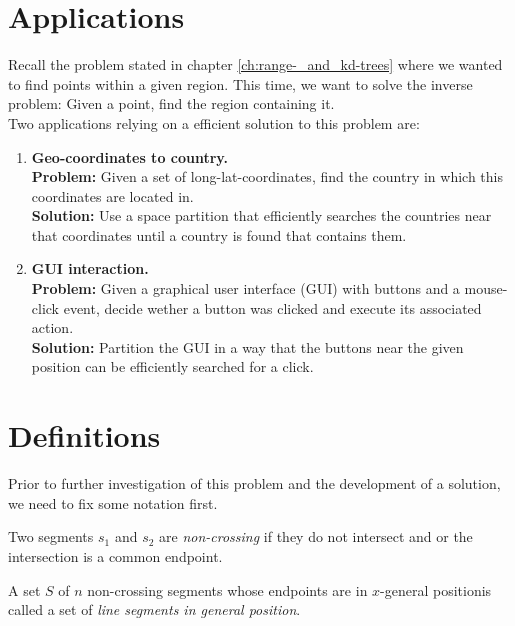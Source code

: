 \section{Applications}
    Recall the problem stated in chapter \ref{ch:range-_and_kd-trees} where we wanted to find points within a given region. This time, we want to solve the inverse problem: Given a point, find the region containing it. \\
    Two applications relying on a efficient solution to this problem are:
    \begin{enumerate}
        \item \textbf{Geo-coordinates to country.} \\
        \textbf{Problem:} Given a set of long-lat-coordinates, find the country in which this coordinates are located in. \\ 
        \textbf{Solution:} Use a space partition that efficiently searches the countries near that coordinates until a country is found that contains them. 

        \item \textbf{GUI interaction.} \\
        \textbf{Problem:} Given a graphical user interface (GUI) with buttons and a mouse-click event, decide wether a button was clicked and execute its associated action. \\
        \textbf{Solution:} Partition the GUI in a way that the buttons near the given position can be efficiently searched for a click. 
    \end{enumerate}

\section{Definitions}
    Prior to further investigation of this problem and the development of a solution, we need to fix some notation first.
    
    \begin{definition} 
        Two segments $s_1$ and $s_2$ are \emph{non-crossing} if they do not intersect and or the intersection is a common endpoint. 
    \end{definition}

    \begin{definition}
        A set $S$ of $n$ non-crossing segments whose endpoints are in $x$-general position\footnotemark is called a set of \emph{line segments in general position}.
    \end{definition}

